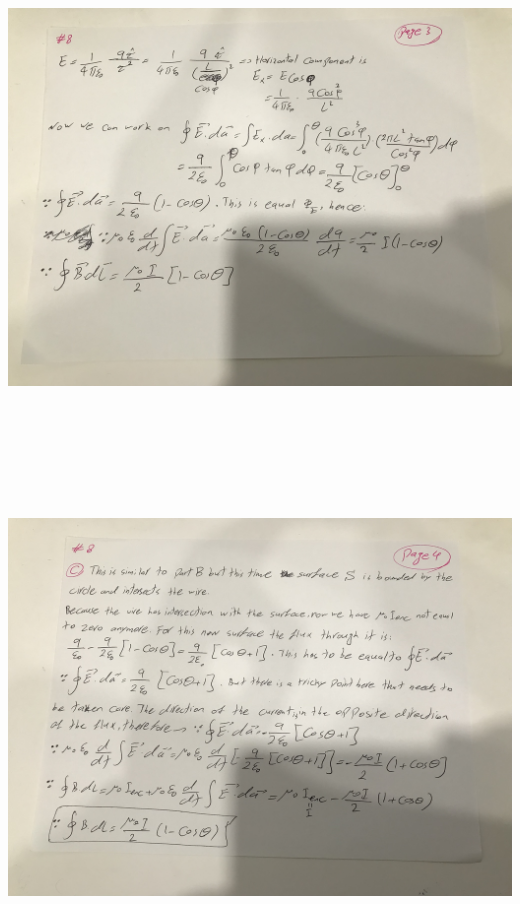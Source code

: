 \documentclass[fleqn]{article}
\begin{document}
\begin{enumerate}
    \pagebreak

    \includegraphics[height=13cm, width=15cm]{8C.jpg}

    \pagebreak
    
    \includegraphics[height=13cm, width=15cm]{8D.jpg}

    \pagebreak


  \end{enumerate}
\end{document}
